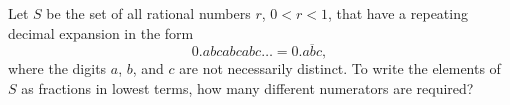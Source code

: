 Let $S$ be the set of all rational numbers $r$, $0<r<1$, that have a repeating decimal expansion in the form \[0.abcabcabc\ldots=0.\overline{abc},\]where the digits $a$, $b$, and $c$ are not necessarily distinct. To write the elements of $S$ as fractions in lowest terms, how many different numerators are required?